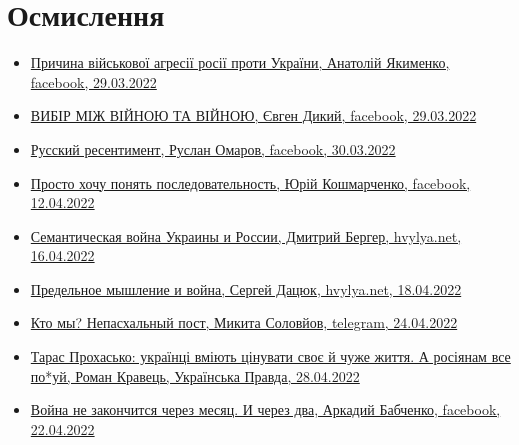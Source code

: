  
 
 
 
 
\section{Осмислення}
\label{sec:topics.vojna.osmyslenie}

\begin{itemize} %

\item \hyperlink{29_03_2022.fb.jakimenko_anatolij.1.prichina_agressii}{%
Причина військової агресії росії проти України, Анатолій Якименко, facebook, 29.03.2022%
}

\item \hyperlink{29_03_2022.fb.dykyj_evgen.1.vijna_vijna}{%
ВИБІР МІЖ ВІЙНОЮ ТА ВІЙНОЮ, Євген Дикий, facebook, 29.03.2022%
}

\item \hyperlink{30_03_2022.fb.omarov_ruslan.1.russkij_ressentiment}{%
Русский ресентимент, Руслан Омаров, facebook, 30.03.2022%
}

\item \hyperlink{12_04_2022.fb.koshmarchenko_jurij.1.posledovatelnost}{%
Просто хочу понять последовательность, Юрій Кошмарченко, facebook, 12.04.2022%
}

\item \hyperlink{16_04_2022.stz.news.ua.hvylya.1.semantic_war_ukrros}{%
Семантическая война Украины и России, Дмитрий Бергер, hvylya.net, 16.04.2022
}

\item \hyperlink{18_04_2022.stz.news.ua.hvylya.1.predelnoje_myshlenie_i_vojna}{%
Предельное мышление и война, Сергей Дацюк, hvylya.net, 18.04.2022%
}

\item \hyperlink{24_04_2022.tg.solovjov_mikita.harkov.demsokyra.1.kto_my_nepashalnyj_post}{%
Кто мы? Непасхальный пост, Микита Соловйов, telegram, 24.04.2022%
}

\item \hyperlink{28_04_2022.stz.news.ua.pravda.1.prohasjko_rossiane_pohuj}{%
Тарас Прохасько: українці вміють цінувати своє й чуже життя. А росіянам все по*уй, %
Роман Кравець, Українська Правда, 28.04.2022%
}


\item \hyperlink{22_04_2022.fb.babchenko_arkadii.1.vojna_ne_zakonchitsja}{%
Война не закончится через месяц. И через два, Аркадий Бабченко, facebook, 22.04.2022%
}

\end{itemize} %
